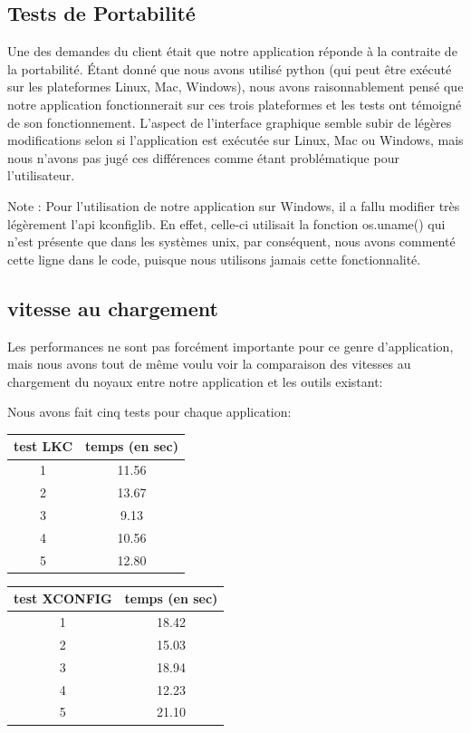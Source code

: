 \documentclass[16pts]{report}
\begin{document}
\subsection{Tests de Portabilité}

Une des demandes du client était que notre application réponde à la contraite
de la portabilité. Étant donné que nous avons utilisé python (qui peut être 
exécuté sur les plateformes Linux, Mac, Windows), nous avons raisonnablement
pensé que notre application fonctionnerait sur ces trois plateformes et les tests
ont témoigné de son fonctionnement. L'aspect de l'interface graphique semble
subir de légères modifications selon si l'application est exécutée sur Linux,
Mac ou Windows, mais nous n'avons pas jugé ces différences comme étant
problématique pour l'utilisateur.

Note : Pour l'utilisation de notre application sur Windows, il a fallu modifier
très légèrement l'api kconfiglib. En effet, celle-ci utilisait la fonction
os.uname() qui n'est présente que dans les systèmes unix, par conséquent, nous
avons commenté cette ligne dans le code, puisque nous utilisons jamais cette 
fonctionnalité.



\subsection{vitesse au chargement}

Les performances ne sont pas forcément importante pour ce genre d'application,
mais nous avons tout de même voulu voir la comparaison des vitesses au 
chargement du noyaux entre notre application et les outils existant:

Nous avons fait cinq tests pour chaque application:

\begin{tabular}{|c|c|}
\hline
test LKC & temps (en sec) \\
\hline
\hline
1 & 11.56 \\
\hline
2 & 13.67 \\
\hline
3 & 9.13 \\
\hline
4 & 10.56 \\
\hline
5 & 12.80 \\
\hline
\end{tabular}

\begin{tabular}{|c|c|}
\hline
test XCONFIG & temps (en sec) \\
\hline
\hline
1 & 18.42 \\
\hline
2 & 15.03 \\
\hline
3 & 18.94 \\
\hline
4 & 12.23 \\
\hline
5 & 21.10 \\
\hline
\end{tabular}
\end{document}
